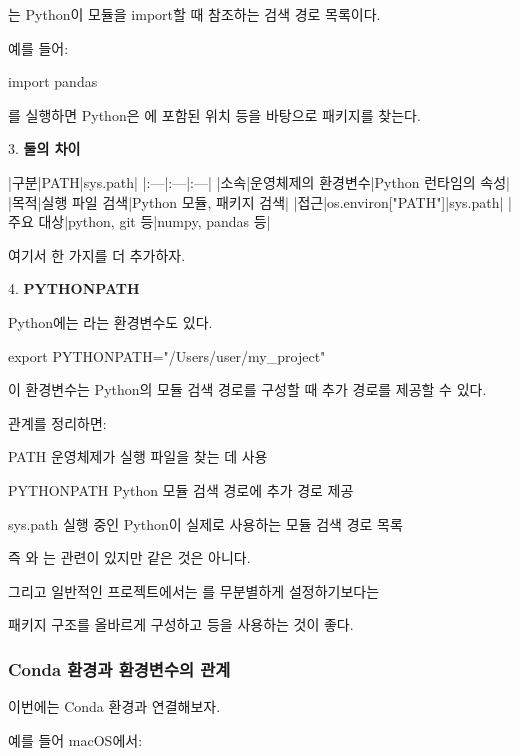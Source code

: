 는 Python이 모듈을 import할 때 참조하는 검색 경로 목록이다.

예를 들어:

\begin{dhkcode}
import pandas
\end{dhkcode}

를 실행하면 Python은 에 포함된 위치 등을 바탕으로  패키지를 찾는다.


3. \textbf{둘의 차이}

\begin{dhktable}
|구분|PATH|sys.path|
|:---|:---|:---|
|소속|운영체제의 환경변수|Python 런타임의 속성|
|목적|실행 파일 검색|Python 모듈, 패키지 검색|
|접근|os.environ["PATH"]|sys.path|
|주요 대상|python, git 등|numpy, pandas 등|
\end{dhktable}

여기서 한 가지를 더 추가하자.


4. \textbf{PYTHONPATH}

Python에는 라는 환경변수도 있다.

\begin{dhkzsh}
export PYTHONPATH="/Users/user/my_project"
\end{dhkzsh}

이 환경변수는 Python의 모듈 검색 경로를 구성할 때 추가 경로를 제공할 수 있다.

관계를 정리하면:

\begin{dhksmry}
    PATH
    \ra 운영체제가 실행 파일을 찾는 데 사용


    PYTHONPATH
    \ra Python 모듈 검색 경로에 추가 경로 제공


    sys.path
    \ra 실행 중인 Python이 실제로 사용하는 모듈 검색 경로 목록
\end{dhksmry}

즉 와 는 관련이 있지만 같은 것은 아니다.

그리고 일반적인 프로젝트에서는 를 무분별하게 설정하기보다는

패키지 구조를 올바르게 구성하고  등을 사용하는 것이 좋다.

\subsubsection{Conda 환경과 환경변수의 관계}

이번에는 Conda 환경과 연결해보자.

예를 들어 macOS에서:

